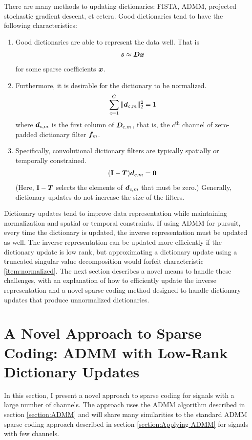 There are many methods to updating dictionaries: FISTA, ADMM, projected stochastic gradient descent, et cetera. Good dictionaries tend to have the following characteristics:
\begin{enumerate}
\item Good dictionaries are able to represent the data well. That is \label{item:improvement property}
\begin{equation}
\bm{s} \approx \bm{D}\bm{x}
\end{equation}
for some sparse coefficients $\bm{x}$.
\item Furthermore, it is desirable for the dictionary to be normalized.\label{item:normalized}
\begin{equation}
\sum_{c = 1}^C \|\bm{d}_{c,m}\|_2^2 = 1
\end{equation}
where $\bm{d}_{c,m}$ is the first column of $\bm{D}_{c,m}$, that is, the $c^{\text{th}}$ channel of zero-padded dictionary filter $\bm{f}_m$.
\item Specifically, convolutional dictionary filters are typically spatially or temporally constrained. \label{item:spatially constrained}
\begin{equation}
({\bf I} - \bm{T})\bm{d}_{c,m} = \bm{0}
\end{equation}
(Here, ${\bf I} - \bm{T}$ selects the elements of $\bm{d}_{c,m}$ that must be zero.) Generally, dictionary updates do not increase the size of the filters.
\end{enumerate}

Dictionary updates tend to improve data representation while maintaining normalization and spatial or temporal constraints.  If using ADMM for pursuit, every time the dictionary is updated, the inverse representation must be updated as well. The inverse representation can be updated more efficiently if the dictionary update is low rank, but approximating a dictionary update using a truncated singular value decomposition would forfeit characteristic \ref{item:normalized}. The next section describes a novel means to handle these challenges, with an explanation of how to efficiently update the inverse representation and a novel sparse coding method designed to handle dictionary updates that produce unnormalized dictionaries.

\section{A Novel Approach to Sparse Coding: ADMM with Low-Rank Dictionary Updates}
In this section, I present a novel approach to sparse coding for signals with a large number of channels. The approach uses the ADMM algorithm described in section \ref{section:ADMM} and will share many similarities to the standard ADMM sparse coding approach described in section \ref{section:Applying ADMM} for signals with few channels.

